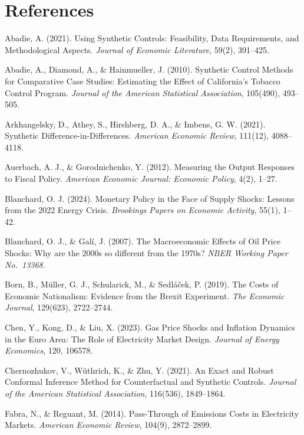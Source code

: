 \documentclass[12pt, a4paper]{article}
\begin{document}
\section*{References}

\hangindent=0.5cm Abadie, A. (2021). Using Synthetic Controls: Feasibility, Data Requirements, and Methodological Aspects. \textit{Journal of Economic Literature}, 59(2), 391--425.

\hangindent=0.5cm Abadie, A., Diamond, A., \& Hainmueller, J. (2010). Synthetic Control Methods for Comparative Case Studies: Estimating the Effect of California's Tobacco Control Program. \textit{Journal of the American Statistical Association}, 105(490), 493--505.

\hangindent=0.5cm Arkhangelsky, D., Athey, S., Hirshberg, D. A., \& Imbens, G. W. (2021). Synthetic Difference-in-Differences. \textit{American Economic Review}, 111(12), 4088--4118.

\hangindent=0.5cm Auerbach, A. J., \& Gorodnichenko, Y. (2012). Measuring the Output Responses to Fiscal Policy. \textit{American Economic Journal: Economic Policy}, 4(2), 1--27.

\hangindent=0.5cm Blanchard, O. J. (2024). Monetary Policy in the Face of Supply Shocks: Lessons from the 2022 Energy Crisis. \textit{Brookings Papers on Economic Activity}, 55(1), 1--42.

\hangindent=0.5cm Blanchard, O. J., \& Gal\'{i}, J. (2007). The Macroeconomic Effects of Oil Price Shocks: Why are the 2000s so different from the 1970s? \textit{NBER Working Paper No.\ 13368}.

\hangindent=0.5cm Born, B., M\"{u}ller, G. J., Schularick, M., \& Sedl\'{a}\v{c}ek, P. (2019). The Costs of Economic Nationalism: Evidence from the Brexit Experiment. \textit{The Economic Journal}, 129(623), 2722--2744.

\hangindent=0.5cm Chen, Y., Kong, D., \& Liu, X. (2023). Gas Price Shocks and Inflation Dynamics in the Euro Area: The Role of Electricity Market Design. \textit{Journal of Energy Economics}, 120, 106578.

\hangindent=0.5cm Chernozhukov, V., W\"{u}thrich, K., \& Zhu, Y. (2021). An Exact and Robust Conformal Inference Method for Counterfactual and Synthetic Controls. \textit{Journal of the American Statistical Association}, 116(536), 1849--1864.

\hangindent=0.5cm Fabra, N., \& Reguant, M. (2014). Pass-Through of Emissions Costs in Electricity Markets. \textit{American Economic Review}, 104(9), 2872--2899.
\end{document}
